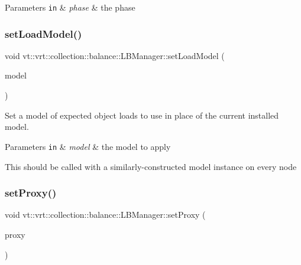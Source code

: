 \begin{DoxyParams}[1]{Parameters}
\mbox{\tt in}  & {\em phase} & the phase \\
\hline
\end{DoxyParams}
\mbox{\label{structvt_1_1vrt_1_1collection_1_1balance_1_1_l_b_manager_a57813a70e0395907021a14c9e2bc1916}} 
\subsubsection{\texorpdfstring{set\+Load\+Model()}{setLoadModel()}}
{\footnotesize\ttfamily void vt\+::vrt\+::collection\+::balance\+::\+L\+B\+Manager\+::set\+Load\+Model (\begin{DoxyParamCaption}\item[{std\+::shared\+\_\+ptr$<$ \hyperlink{classvt_1_1vrt_1_1collection_1_1balance_1_1_load_model}{Load\+Model} $>$}]{model }\end{DoxyParamCaption})}



Set a model of expected object loads to use in place of the current installed model. 


\begin{DoxyParams}[1]{Parameters}
\mbox{\tt in}  & {\em model} & the model to apply\\
\hline
\end{DoxyParams}
This should be called with a similarly-\/constructed model instance on every node \mbox{\label{structvt_1_1vrt_1_1collection_1_1balance_1_1_l_b_manager_aacef5b639acd9d984b9bcb79ecb9c6a9}} 
\subsubsection{\texorpdfstring{set\+Proxy()}{setProxy()}}
{\footnotesize\ttfamily void vt\+::vrt\+::collection\+::balance\+::\+L\+B\+Manager\+::set\+Proxy (\begin{DoxyParamCaption}\item[{\hyperlink{structvt_1_1objgroup_1_1proxy_1_1_proxy}{objgroup\+::proxy\+::\+Proxy}$<$ \hyperlink{structvt_1_1vrt_1_1collection_1_1balance_1_1_l_b_manager}{L\+B\+Manager} $>$}]{proxy }\end{DoxyParamCaption})\hspace{0.3cm}{\ttfamily [inline]}}



